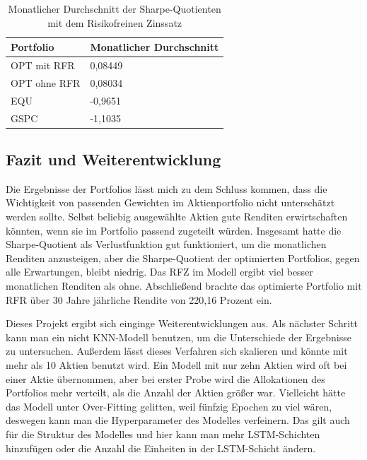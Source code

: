 \documentclass[12pt]{article}
\begin{document}
        \begin{table}[htp]
            \begin{center}
                
                \begin{tabular}{ | l | l | }

                    \hline
                    \textbf{Portfolio}   & \textbf{Monatlicher Durchschnitt} \\
                    \hline
                    OPT mit RFR          & 0,08449 \\      
                    OPT ohne RFR         & 0,08034 \\
                    EQU                  & -0,9651 \\            
                    GSPC                 & -1,1035 \\     
                            
                    \hline

                \end{tabular}
                \caption{Monatlicher Durchschnitt der Sharpe-Quotienten mit dem Risikofreinen Zinssatz}
                \label{md-sq-mit-rfz}

            \end{center}
        \end{table}

        
        \newpage \subsection{Fazit und Weiterentwicklung}

        Die Ergebnisse der Portfolios lässt mich zu dem Schluss kommen, 
        dass die Wichtigkeit von passenden Gewichten im Aktienportfolio nicht unterschätzt werden sollte. 
        Selbst beliebig ausgewählte Aktien gute Renditen erwirtschaften könnten, wenn sie im Portfolio passend zugeteilt würden. 
        Insgesamt hatte die Sharpe-Quotient als Verlustfunktion gut funktioniert, um die monatlichen Renditen anzusteigen, 
        aber die Sharpe-Quotient der optimierten Portfolios, gegen alle Erwartungen, bleibt niedrig. 
        Das RFZ im Modell ergibt viel besser monatlichen Renditen als ohne. 
        Abschließend brachte das optimierte Portfolio mit RFR über 30 Jahre jährliche Rendite von 220,16 Prozent ein.

        Dieses Projekt ergibt sich einginge Weiterentwicklungen aus. 
        Als nächster Schritt kann man ein nicht KNN-Modell benutzen, um die Unterschiede der Ergebnisse zu untersuchen. 
        Außerdem lässt dieses Verfahren sich skalieren und könnte mit mehr als 10 Aktien benutzt wird. 
        Ein Modell mit nur zehn Aktien wird oft bei einer Aktie übernommen, 
        aber bei erster Probe wird die Allokationen des Portfolios mehr verteilt, als die Anzahl der Aktien größer war. 
        Vielleicht hätte das Modell unter Over-Fitting gelitten, weil fünfzig Epochen zu viel wären, 
        deswegen kann man die Hyperparameter des Modelles verfeinern. 
        Das gilt auch für die Struktur des Modelles und hier kann man mehr LSTM-Schichten hinzufügen oder 
        die Anzahl die Einheiten in der LSTM-Schicht ändern.
    
    
    \printbibliography[heading=bibintoc, title={Literaturverzeichnis}]
\end{document}
